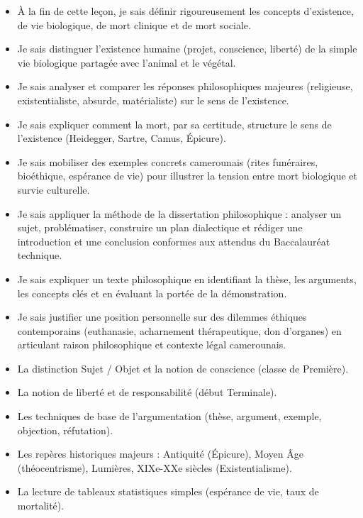 \documentclass[11pt]{article}
\begin{document}
\begin{objectifs}
\begin{itemize}
\item À la fin de cette leçon, je sais définir rigoureusement les concepts d'existence, de vie biologique, de mort clinique et de mort sociale.
\item Je sais distinguer l'existence humaine (projet, conscience, liberté) de la simple vie biologique partagée avec l'animal et le végétal.
\item Je sais analyser et comparer les réponses philosophiques majeures (religieuse, existentialiste, absurde, matérialiste) sur le sens de l'existence.
\item Je sais expliquer comment la mort, par sa certitude, structure le sens de l'existence (Heidegger, Sartre, Camus, Épicure).
\item Je sais mobiliser des exemples concrets camerounais (rites funéraires, bioéthique, espérance de vie) pour illustrer la tension entre mort biologique et survie culturelle.
\item Je sais appliquer la méthode de la dissertation philosophique : analyser un sujet, problématiser, construire un plan dialectique et rédiger une introduction et une conclusion conformes aux attendus du Baccalauréat technique.
\item Je sais expliquer un texte philosophique en identifiant la thèse, les arguments, les concepts clés et en évaluant la portée de la démonstration.
\item Je sais justifier une position personnelle sur des dilemmes éthiques contemporains (euthanasie, acharnement thérapeutique, don d'organes) en articulant raison philosophique et contexte légal camerounais.
\end{itemize}
\end{objectifs}

\begin{prerequis}
\begin{itemize}
\item La distinction Sujet / Objet et la notion de conscience (classe de Première).
\item La notion de liberté et de responsabilité (début Terminale).
\item Les techniques de base de l'argumentation (thèse, argument, exemple, objection, réfutation).
\item Les repères historiques majeurs : Antiquité (Épicure), Moyen Âge (théocentrisme), Lumières, XIXe-XXe siècles (Existentialisme).
\item La lecture de tableaux statistiques simples (espérance de vie, taux de mortalité).
\end{itemize}
\end{prerequis}
\end{document}
